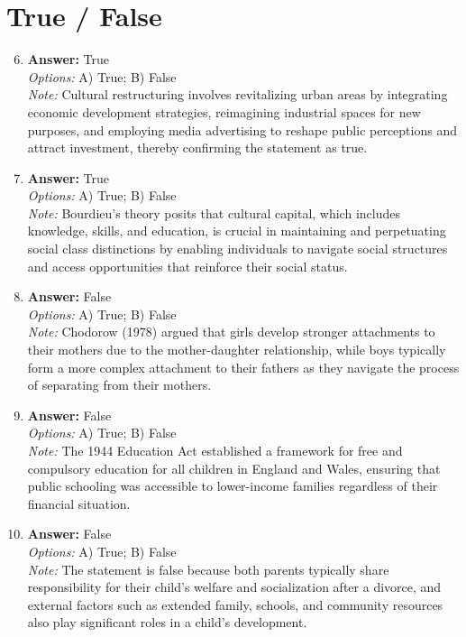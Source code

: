 \documentclass[12pt]{article}
\begin{document}
\section*{True / False}
\begin{enumerate}[label=\arabic*.]
\setcounter{enumi}{5}
\item \textbf{Answer:} True
\\ \textit{Options:} A) True; B) False
\\ \textit{Note:} Cultural restructuring involves revitalizing urban areas by integrating economic development strategies, reimagining industrial spaces for new purposes, and employing media advertising to reshape public perceptions and attract investment, thereby confirming the statement as true.
\item \textbf{Answer:} True
\\ \textit{Options:} A) True; B) False
\\ \textit{Note:} Bourdieu's theory posits that cultural capital, which includes knowledge, skills, and education, is crucial in maintaining and perpetuating social class distinctions by enabling individuals to navigate social structures and access opportunities that reinforce their social status.
\item \textbf{Answer:} False
\\ \textit{Options:} A) True; B) False
\\ \textit{Note:} Chodorow (1978) argued that girls develop stronger attachments to their mothers due to the mother-daughter relationship, while boys typically form a more complex attachment to their fathers as they navigate the process of separating from their mothers.
\item \textbf{Answer:} False
\\ \textit{Options:} A) True; B) False
\\ \textit{Note:} The 1944 Education Act established a framework for free and compulsory education for all children in England and Wales, ensuring that public schooling was accessible to lower-income families regardless of their financial situation.
\item \textbf{Answer:} False
\\ \textit{Options:} A) True; B) False
\\ \textit{Note:} The statement is false because both parents typically share responsibility for their child's welfare and socialization after a divorce, and external factors such as extended family, schools, and community resources also play significant roles in a child's development.
\end{enumerate}
\end{document}
